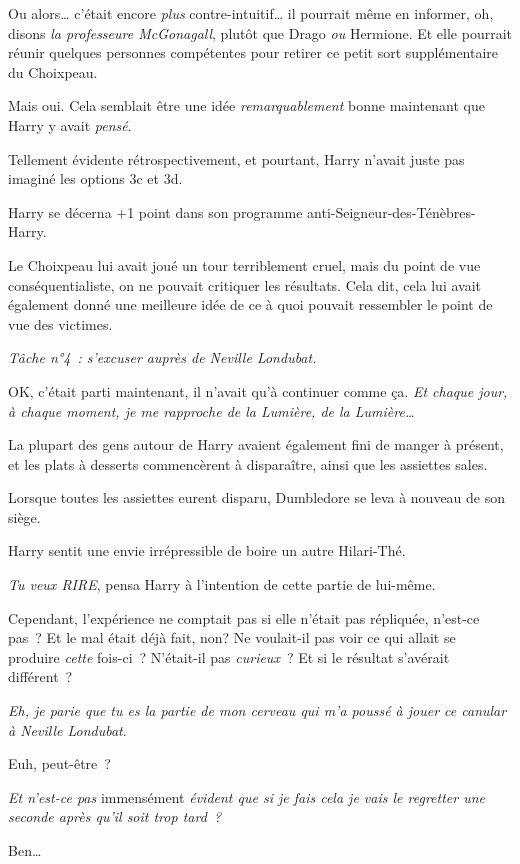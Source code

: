 Ou alors… c'était encore \emph{plus} contre-intuitif… il pourrait même en informer, oh, disons \emph{la professeure McGonagall}, plutôt que Drago \emph{ou} Hermione.
Et elle pourrait réunir quelques personnes compétentes pour retirer ce petit sort supplémentaire du Choixpeau.

Mais oui. Cela semblait être une idée \emph{remarquablement} bonne maintenant que Harry y avait \emph{pensé}.

Tellement évidente rétrospectivement, et pourtant, Harry n'avait juste pas imaginé les options 3c et 3d.

Harry se décerna +1 point dans son programme anti-Seigneur-des-Ténèbres-Harry.

Le Choixpeau lui avait joué un tour terriblement cruel, mais du point de vue conséquentialiste, on ne pouvait critiquer les résultats.
Cela dit, cela lui avait également donné une meilleure idée de ce à quoi pouvait ressembler le point de vue des victimes.

\emph{Tâche n°4~: s'excuser auprès de Neville Londubat.}

OK, c'était parti maintenant, il n'avait qu'à continuer comme ça.
\emph{Et chaque jour, à chaque moment, je me rapproche de la Lumière, de la Lumière…}

La plupart des gens autour de Harry avaient également fini de manger à présent, et les plats à desserts commencèrent à disparaître, ainsi que les assiettes sales.

Lorsque toutes les assiettes eurent disparu, Dumbledore se leva à nouveau de son siège.

Harry sentit une envie irrépressible de boire un autre Hilari-Thé.

\emph{Tu veux RIRE}, pensa Harry à l'intention de cette partie de lui-même.

Cependant, l'expérience ne comptait pas si elle n'était pas répliquée, n'est-ce pas~?
Et le mal était déjà fait, non?
Ne voulait-il pas voir ce qui allait se produire \emph{cette} fois-ci~?
N'était-il pas \emph{curieux}~?
Et si le résultat s'avérait différent~?

\emph{Eh, je parie que tu es la partie de mon cerveau qui m'a poussé à jouer ce canular à Neville Londubat}.

Euh, peut-être~?

\emph{Et n'est-ce pas} immensément \emph{évident que si je fais cela je vais le regretter une seconde après qu'il soit trop tard~?}

Ben…

